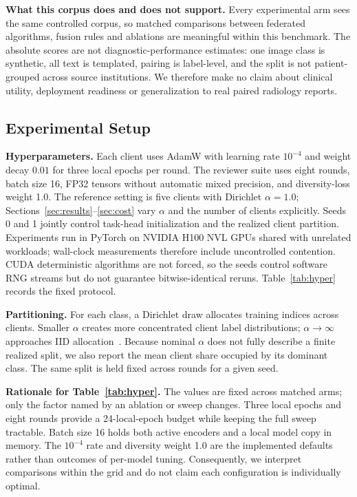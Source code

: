 \documentclass[letterpaper, conference]{IEEEtran}
\begin{document}
\label{sec:corpus}
\textbf{What this corpus does and does not support.}
Every experimental arm sees the same controlled corpus, so matched comparisons
between federated algorithms, fusion rules and ablations are meaningful within
this benchmark. The absolute scores are not diagnostic-performance estimates:
one image class is synthetic, all text is templated, pairing is label-level, and
the split is not patient-grouped across source institutions. We therefore make no
claim about clinical utility, deployment readiness or generalization to real
paired radiology reports.

\subsection{Experimental Setup}

\textbf{Hyperparameters.}
Each client uses AdamW with learning rate $10^{-4}$ and weight decay $0.01$ for
three local epochs per round. The reviewer suite uses eight rounds, batch size 16,
FP32 tensors without automatic mixed precision, and diversity-loss weight 1.0. The reference setting is five
clients with Dirichlet $\alpha=1.0$; Sections~\ref{sec:results}--\ref{sec:cost}
vary $\alpha$ and the number of clients explicitly. Seeds 0 and 1 jointly control
task-head initialization and the realized client partition. Experiments run in
PyTorch on NVIDIA H100 NVL GPUs shared with unrelated workloads; wall-clock
measurements therefore include uncontrolled contention. CUDA deterministic
algorithms are not forced, so the seeds control software RNG streams but do not
guarantee bitwise-identical reruns. Table~\ref{tab:hyper} records the fixed protocol.

\textbf{Partitioning.}
For each class, a Dirichlet draw allocates training indices across clients.
Smaller $\alpha$ creates more concentrated client label distributions;
$\alpha\!\to\!\infty$ approaches IID allocation~\cite{Hsu2019}. Because nominal $\alpha$ does
not fully describe a finite realized split, we also report the mean client share
occupied by its dominant class. The same split is held fixed across rounds for a
given seed.

\textbf{Rationale for Table~\ref{tab:hyper}.}
The values are fixed across matched arms; only the factor named by an ablation or
sweep changes. Three local epochs and eight rounds provide a 24-local-epoch budget
while keeping the full sweep tractable. Batch size 16 holds both active encoders
and a local model copy in memory. The $10^{-4}$ rate and diversity weight 1.0 are
the implemented defaults rather than outcomes of per-model tuning. Consequently,
we interpret comparisons within the grid and do not claim each configuration is
individually optimal.
\end{document}

